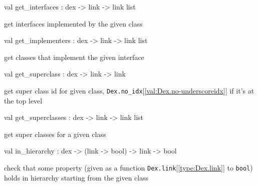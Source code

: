 \documentclass[11pt]{article}
\begin{document}
\label{val:Dex.get-underscoreinterfaces}\begin{ocamldoccode}
val get_interfaces : dex -> link -> link list
\end{ocamldoccode}
\begin{ocamldocdescription}
get interfaces implemented by the given class


\end{ocamldocdescription}




\label{val:Dex.get-underscoreimplementers}\begin{ocamldoccode}
val get_implementers : dex -> link -> link list
\end{ocamldoccode}
\begin{ocamldocdescription}
get classes that implement the given interface


\end{ocamldocdescription}




\label{val:Dex.get-underscoresuperclass}\begin{ocamldoccode}
val get_superclass : dex -> link -> link
\end{ocamldoccode}
\begin{ocamldocdescription}
get super class id for given class,
 {\tt{Dex.no\_idx}}[\ref{val:Dex.no-underscoreidx}] if it's at the top level


\end{ocamldocdescription}




\label{val:Dex.get-underscoresuperclasses}\begin{ocamldoccode}
val get_superclasses : dex -> link -> link list
\end{ocamldoccode}
\begin{ocamldocdescription}
get super classes for a given class


\end{ocamldocdescription}




\label{val:Dex.in-underscorehierarchy}\begin{ocamldoccode}
val in_hierarchy : dex -> (link -> bool) -> link -> bool
\end{ocamldoccode}
\begin{ocamldocdescription}
check that some property (given as a function {\tt{Dex.link}}[\ref{type:Dex.link}] to {\tt{bool}})
 holds in hierarchy starting from the given class


\end{ocamldocdescription}
\end{document}
